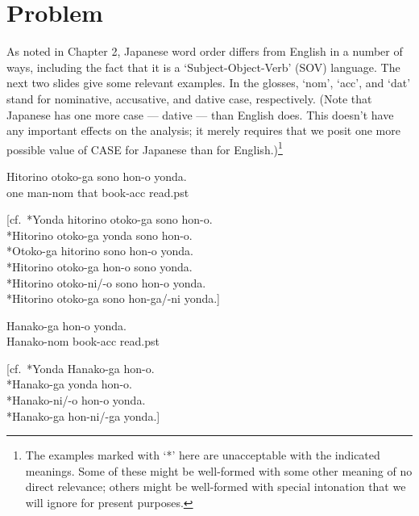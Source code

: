 \documentclass[a4paper,landscape,headrule,footrule]{foils}
\begin{document}


\section{Problem}

As noted in Chapter 2, Japanese word order differs from English in a
number of ways, including the fact that it is a `Subject-Object-Verb'
(SOV) language.  The next two slides give some relevant examples. In
the glosses, `{\sc nom}', `{\sc acc}', and `{\sc dat}' stand for
nominative, accusative, and dative case, respectively.  (Note that
Japanese has one more case --- dative --- than English does.  This
doesn't have any important effects on the analysis; it merely requires
that we posit one more possible value of CASE for Japanese than for
English.)\footnote{The examples marked with `*' here are unacceptable
  with the indicated meanings.  Some of these might be well-formed
  with some other meaning of no direct relevance; others might be
  well-formed with special intonation that we will ignore for present
  purposes.}

\begin{exe}
  \ex\label{jp:first} %
  \gll Hitorino  otoko-ga sono  hon-o yonda. \\
 one  man-{\sc nom} that  book-{\sc acc} read.{\sc pst} \\

[cf.\ *Yonda hitorino otoko-ga sono hon-o. \\ {*}Hitorino otoko-ga yonda
sono hon-o. \\ {*}Otoko-ga hitorino sono hon-o yonda. \\ {*}Hitorino
otoko-ga hon-o sono yonda. \\ {*}Hitorino otoko-ni/-o sono hon-o
yonda. \\ {*}Hitorino otoko-ga sono hon-ga/-ni yonda.]
\end{exe}

\begin{exe}
\ex 
\gll  Hanako-ga  hon-o  yonda. \\
 Hanako-{\sc nom}  book-{\sc acc}  read.{\sc pst} \\

[cf.\ *Yonda Hanako-ga hon-o. \\ {*}Hanako-ga yonda hon-o. \\
{*}Hanako-ni/-o hon-o yonda. \\ {*}Hanako-ga hon-ni/-ga yonda.]
\end{exe}
\end{document}
